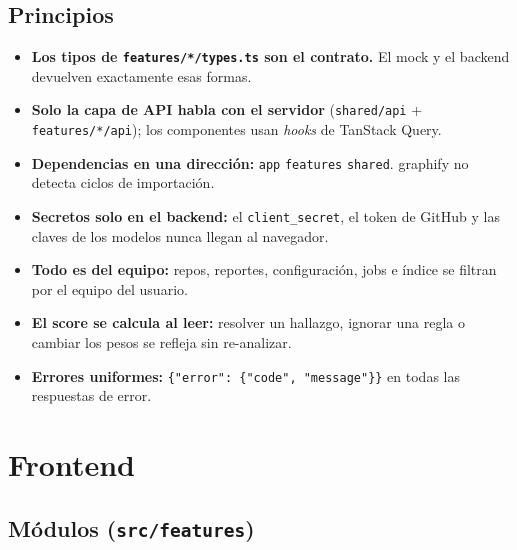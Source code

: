 \documentclass[11pt,a4paper]{article}
\newcommand{\code}[1]{\texttt{\small #1}}
\newcommand{\ruta}[1]{\texttt{\small\color{branddark}#1}}
\newcommand{\flecha}{\textrightarrow{}}
\begin{document}
\subsection{Principios}
\begin{itemize}
  \item \textbf{Los tipos de \code{features/*/types.ts} son el contrato.} El mock y el backend devuelven exactamente esas formas.
  \item \textbf{Solo la capa de API habla con el servidor} (\ruta{shared/api} + \ruta{features/*/api}); los componentes usan \emph{hooks} de TanStack Query.
  \item \textbf{Dependencias en una dirección:} \code{app} \flecha{} \code{features} \flecha{} \code{shared}. graphify no detecta ciclos de importación.
  \item \textbf{Secretos solo en el backend:} el \code{client\_secret}, el token de GitHub y las claves de los modelos nunca llegan al navegador.
  \item \textbf{Todo es del equipo:} repos, reportes, configuración, jobs e índice se filtran por el equipo del usuario.
  \item \textbf{El score se calcula al leer:} resolver un hallazgo, ignorar una regla o cambiar los pesos se refleja sin re-analizar.
  \item \textbf{Errores uniformes:} \code{\{"error": \{"code", "message"\}\}} en todas las respuestas de error.
\end{itemize}

\section{Frontend}

\subsection{Módulos (\code{src/features})}
\end{document}
